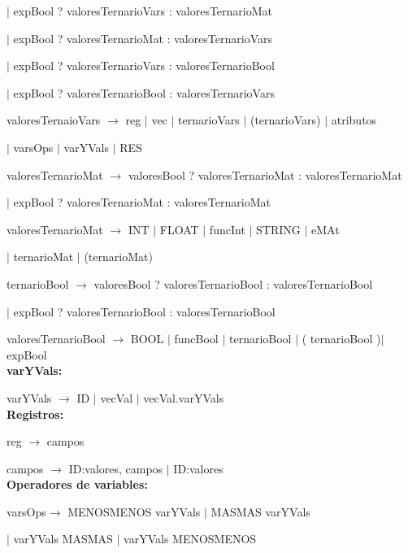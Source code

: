 \documentclass[10pt, a4paper]{article}
\begin{document}
  \hspace{15mm}$|$  expBool ? valoresTernarioVars : valoresTernarioMat 
  
  \hspace{15mm}$|$  expBool ? valoresTernarioMat : valoresTernarioVars
  
  \hspace{15mm}$|$  expBool ? valoresTernarioVars : valoresTernarioBool 
  
  \hspace{15mm}$|$  expBool ? valoresTernarioBool : valoresTernarioVars  
  

  
valoresTernaioVars $\rightarrow$ reg $|$ vec $|$ ternarioVars $|$ (ternarioVars) $|$ atributos 

\hspace{15mm}$|$ varsOps  $|$ varYVals $|$ RES

valoresTernarioMat $\rightarrow$ valoresBool ? valoresTernarioMat : valoresTernarioMat  

\hspace{15mm}$|$ expBool ? valoresTernarioMat : valoresTernarioMat
  
valoresTernarioMat $\rightarrow$ INT $|$ FLOAT $|$ funcInt $|$ STRING $|$ eMAt 

\hspace{15mm}$|$ ternarioMat $|$ (ternarioMat)

ternarioBool $\rightarrow$ valoresBool ? valoresTernarioBool : valoresTernarioBool  

\hspace{15mm}$|$ expBool ? valoresTernarioBool : valoresTernarioBool
  
valoresTernarioBool $\rightarrow$ BOOL $|$ funcBool $|$ ternarioBool $|$ ( ternarioBool )$|$ expBool \\
   

\textbf{varYVals:}

varYVals $\rightarrow$ ID $|$ vecVal $|$ vecVal.varYVals \\


\textbf{Registros:} 

reg $\rightarrow$ {campos}

campos $\rightarrow$ ID:valores, campos $|$ ID:valores \\


\textbf{Operadores de variables:}

varsOps$\rightarrow$ MENOSMENOS varYVals $|$ MASMAS varYVals

\hspace{15mm}$|$ varYVals MASMAS $|$ varYVals MENOSMENOS 
\end{document}
